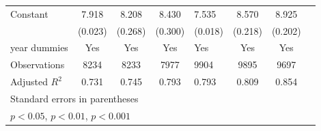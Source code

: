 {\begin{longtable}{l*{3}{c}|l*{3}{c}}
		Constant            &       7.918\sym{***}&       8.208\sym{***}&       8.430\sym{***}&       7.535\sym{***}&       8.570\sym{***}&       8.925\sym{***}\\
		&     (0.023)         &     (0.268)         &     (0.300)         &     (0.018)         &     (0.218)         &     (0.202)         \\
		year dummies        &         Yes         &         Yes         &         Yes         &         Yes         &         Yes         &         Yes         \\
		\midrule
		Observations        &        8234         &        8233         &        7977         &        9904         &        9895         &        9697         \\
		Adjusted \(R^{2}\)  &       0.731         &       0.745         &       0.793         &       0.793         &       0.809         &       0.854         \\
		\bottomrule
		\multicolumn{7}{l}{\footnotesize Standard errors in parentheses}\\
		\multicolumn{7}{l}{\footnotesize \sym{*} \(p<0.05\), \sym{**} \(p<0.01\), \sym{***} \(p<0.001\)}\\
	\end{longtable}
}
